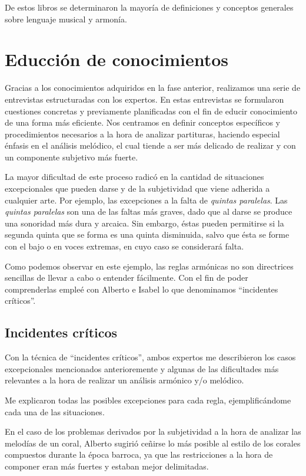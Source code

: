 De estos libros se determinaron la mayoría de definiciones y conceptos generales sobre lenguaje musical y armonía.

\section{Educción de conocimientos}

Gracias a los conocimientos adquiridos en la fase anterior, realizamos una serie de entrevistas estructuradas con los expertos. En estas entrevistas se formularon cuestiones concretas y previamente planificadas con el fin de educir conocimiento de una forma más eficiente. Nos centramos en definir conceptos específicos y procedimientos necesarios a la hora de analizar partituras, haciendo especial énfasis en el análisis melódico, el cual tiende a ser más delicado de realizar y con un componente subjetivo más fuerte.

La mayor dificultad de este proceso radicó en la cantidad de situaciones excepcionales que pueden darse y de la subjetividad que viene adherida a cualquier arte. Por ejemplo, las excepciones a la falta de \textit{quintas paralelas}. Las \textit{quintas paralelas} son una de las faltas más graves, dado que al darse se produce una sonoridad más dura y arcaica. Sin embargo, éstas pueden permitirse si la segunda quinta que se forma es una quinta disminuida, salvo que ésta se forme con el bajo o en voces extremas, en cuyo caso se considerará falta.

Como podemos observar en este ejemplo, las reglas armónicas no son directrices sencillas de llevar a cabo o entender fácilmente. Con el fin de poder comprenderlas empleé con Alberto e Isabel lo que denominamos ``incidentes críticos''. 

\subsection{Incidentes críticos}
 
Con la técnica de ``incidentes críticos'', ambos expertos me describieron los casos excepcionales mencionados anterioremente y algunas de las dificultades más relevantes a la hora de realizar un análisis armónico y/o melódico. 

Me explicaron todas las posibles excepciones para cada regla, ejemplificándome cada una de las situaciones. 

En el caso de los problemas derivados por la subjetividad a la hora de analizar las melodías de un coral, Alberto sugirió ceñirse lo más posible al estilo de los corales compuestos durante la época barroca, ya que las restricciones a la hora de componer eran más fuertes y estaban mejor delimitadas.  

